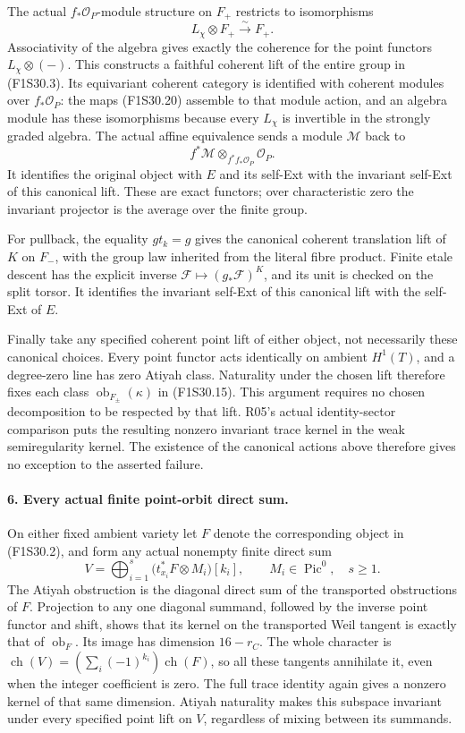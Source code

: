 The actual $f_*\mathcal O_P$-module structure on
$F_+$ restricts to isomorphisms
\[
                         L_\chi\otimes F_+\xrightarrow{\sim}F_+.
 \tag{F1S30.20}
\]
Associativity of the algebra gives exactly the
coherence for the point functors
$L_\chi\otimes(-)$. This constructs a faithful
coherent lift of the entire group in (F1S30.3).
Its equivariant coherent category is identified
with coherent modules over $f_*\mathcal O_P$:
the maps (F1S30.20) assemble to that module action,
and an algebra module has these isomorphisms
because every $L_\chi$ is invertible in the
strongly graded algebra. The actual affine
equivalence sends a module $\mathcal M$ back to
\[
           f^*\mathcal M\otimes_{f^*f_*\mathcal O_P}\mathcal O_P.
 \tag{F1S30.21}
\]
It identifies the original object with $E$ and
its self-Ext with the invariant self-Ext of
this canonical lift. These are exact functors;
over characteristic zero the invariant projector
is the average over the finite group.

For pullback, the equality $g t_k=g$ gives the
canonical coherent translation lift of $K$ on
$F_-$, with the group law inherited from the
literal fibre product. Finite etale descent
has the explicit inverse $\mathcal F\mapsto
(g_*\mathcal F)^K$, and its unit is checked on
the split torsor. It identifies the invariant
self-Ext of this canonical lift with the
self-Ext of $E$.

Finally take any specified coherent point lift
of either object, not necessarily these canonical
choices. Every point functor acts identically
on ambient $H^1(T)$, and a degree-zero line has
zero Atiyah class. Naturality under the chosen
lift therefore fixes each class
$\operatorname{ob}_{F_\pm}(\kappa)$ in (F1S30.15).
This argument requires no chosen decomposition
to be respected by that lift. R05's actual
identity-sector comparison puts the resulting
nonzero invariant trace kernel in the weak
semiregularity kernel. The existence of the
canonical actions above therefore gives no
exception to the asserted failure.

\paragraph{6. Every actual finite point-orbit direct sum.}
On either fixed ambient variety let $F$ denote
the corresponding object in (F1S30.2), and form
any actual nonempty finite direct sum
\[
                    V=\bigoplus_{i=1}^s
                           \bigl(t_{x_i}^*F\otimes M_i\bigr)[k_i],
            \qquad M_i\in\operatorname{Pic}^0,\quad s\ge1.
 \tag{F1S30.22}
\]
The Atiyah obstruction is the diagonal direct
sum of the transported obstructions of $F$.
Projection to any one diagonal summand, followed
by the inverse point functor and shift, shows
that its kernel on the transported Weil tangent
is exactly that of $\operatorname{ob}_F$.
Its image has dimension $16-r_C$.
The whole character is
$\operatorname{ch}(V)=(\sum_i(-1)^{k_i})\operatorname{ch}(F)$,
so all these tangents annihilate it, even when
the integer coefficient is zero. The full trace
identity again gives a nonzero kernel of that
same dimension. Atiyah naturality makes this
subspace invariant under every specified point
lift on $V$, regardless of mixing between its
summands.

